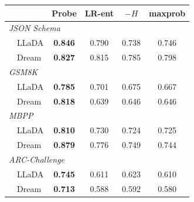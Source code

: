 \documentclass[11pt]{article}
\providecommand{\linenumbers}{}
\providecommand{\nolinenumbers}{}
\begin{document}
\nolinenumbers
\begin{center}
  \small
  \label{tab:entropy_auc}
  \begin{tabular}{lcccc}
    \toprule
    & \textbf{Probe} & \textbf{LR-ent} & \textbf{$-H$} & \textbf{maxprob} \\
    \midrule
    \multicolumn{5}{l}{\textit{JSON Schema}} \\
    ~~LLaDA & \textbf{0.846} & 0.790 & 0.738 & 0.746 \\
    ~~Dream & \textbf{0.827} & 0.815 & 0.785 & 0.798 \\
    \midrule
    \multicolumn{5}{l}{\textit{GSM8K}} \\
    ~~LLaDA & \textbf{0.785} & 0.701 & 0.675 & 0.667 \\
    ~~Dream & \textbf{0.818} & 0.639 & 0.646 & 0.646 \\
    \midrule
    \multicolumn{5}{l}{\textit{MBPP}} \\
    ~~LLaDA & \textbf{0.810} & 0.730 & 0.724 & 0.725 \\
    ~~Dream & \textbf{0.879} & 0.776 & 0.749 & 0.744 \\
    \midrule
    \multicolumn{5}{l}{\textit{ARC-Challenge}} \\
    ~~LLaDA & \textbf{0.745} & 0.611 & 0.623 & 0.610 \\
    ~~Dream & \textbf{0.713} & 0.588 & 0.592 & 0.580 \\
    \bottomrule
  \end{tabular}
\end{center}
\linenumbers
\end{document}
